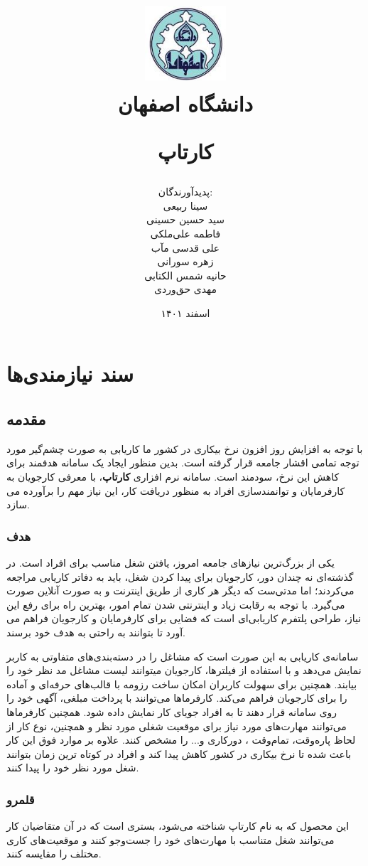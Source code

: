 \documentclass[12pt, svgnames, oneside]{book}
\title{
	\includegraphics[width=3cm, height=3cm]{logo} \\
	{\large دانشگاه اصفهان} \vspace{3mm}
	
	{\Huge کارتاپ}
}
\author{
	پدید‌آورندگان: \\
	سینا ربیعی \\
	سید حسین حسینی \\
	فاطمه علی‌ملکی \\
	علی قدسی مآب \\
	زهره سورانی \\
	حانیه شمس الکتابی \\
	مهدی حق‌وردی
}
\date{اسفند ۱۴۰۱}
\begin{document}
	\renewcommand{\bibname}{مراجع}
	\maketitle
	\frontmatter
	\tableofcontents
	\mainmatter
	
	\chapter{سند نیازمندی‌ها}
		\section{مقدمه} 
			با توجه به افزایش روز افزون نرخ بیکاری در کشور ما کاریابی به صورت چشم‌گیر مورد توجه تمامی اقشار جامعه قرار گرفته است. بدین منظور ایجاد یک سامانه هدفمند برای کاهش این نرخ، سودمند است. سامانه نرم افزاری \textbf{کارتاپ}، با معرفی کارجویان به کارفرمایان و توانمندسازی افراد به منظور دریافت کار، این نیاز مهم را برآورده می سازد.
			\subsection{هدف}
				یکی از بزرگ‌ترین نیازهای جامعه امروز، یافتن شغل مناسب برای افراد است. در گذشته‌ای نه چندان دور، کارجویان برای پیدا کردن شغل، باید به دفاتر کاریابی مراجعه می‌کردند؛ اما مدتی‌ست که دیگر هر کاری از طریق اینترنت و به صورت آنلاین صورت می‌گیرد. با توجه به رقابت زیاد و اینترنتی شدن تمام امور، بهترین راه برای رفع این نیاز، طراحی پلتفرم کاریابی‌‌ای است که فضایی برای کارفرمایان و کارجویان فراهم می آورد تا بتوانند به راحتی به هدف خود برسند.
				
				سامانه‌ی کاریابی به این صورت است که مشاغل را در دسته‌بندی‌های متفاوتی به کاربر نمایش می‌دهد و با استفاده از فیلترها، کارجویان میتوانند لیست مشاغل مد نظر خود را بیابند. همچنین برای سهولت کاربران امکان ساخت رزومه با قالب‌های حرفه‌ای و آماده را برای کارجویان فراهم می‌کند. کارفرما‌ها می‌توانند با پرداخت مبلغی، آگهی خود را روی سامانه قرار دهند تا به افراد جویای کار نمایش داده شود. همچنین کارفرماها می‌توانند مهارت‌های مورد نیاز برای موقعیت شغلی مورد نظر و همچنین، نوع کار از لحاظ پاره‌وقت، تمام‌وقت ، دورکاری و... را مشخص کنند.
				علاوه بر موارد فوق این کار باعث شده تا نرخ بیکاری در کشور کاهش پیدا کند و افراد در کوتاه ترین زمان بتوانند شغل مورد نظر خود را پیدا کنند.
				
			\subsection{قلمرو} 
				این محصول که به نام کارتاپ شناخته می‌شود، بستری است که در آن متقاضیان کار می‌توانند شغل متناسب با مهارت‌های خود را جست‌وجو کنند و موقعیت‌های کاری مختلف را مقایسه کنند.
				
\end{document}
